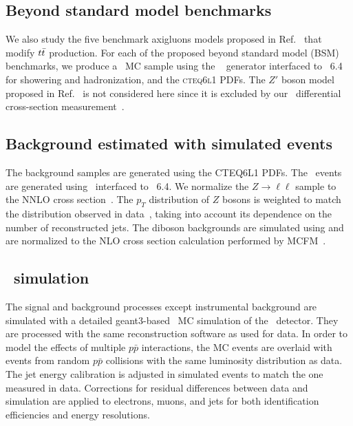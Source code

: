 \documentclass[aps,prd,twocolumn,showpacs,superscriptaddress,groupedaddress,floatfix]{revtex4}
\begin{document}
\subsection{Beyond standard model benchmarks}
\label{sec:BSM_description}

We also study the five benchmark axigluons models proposed in Ref.~\cite{Carmona:2014gra} that modify  $t\bar{t}$ production.
For each of the proposed beyond standard model (BSM) benchmarks,
we  produce a \ttbar\ MC sample 
using the \madgraph~\cite{Alwall:2014hca} generator interfaced to \pythia~6.4 for showering and hadronization, and the \textsc{cteq6l1} PDFs.
The $Z'$ boson model proposed in  Ref.~\cite{Carmona:2014gra} is not
considered here since it is  excluded by our \ttbar\ differential cross-section measurement~\cite{Abazov:2014vga}.

\subsection{Background estimated with simulated events}
\label{sec:bkgmc}
The background samples are generated using the {\textsc{CTEQ6L1}}  PDFs.
The \zl\ events are generated using   \alpgen\ interfaced to \pythia~6.4. We normalize the $Z \rightarrow \ell\ell$ sample to the NNLO cross section~\cite{Gavin:2010az}.
The $p_{T}$ distribution of $Z$ bosons is weighted to match the distribution observed in
data~\cite{Abazov:2007ac}, taking into account its dependence on the number of reconstructed jets. 
The diboson backgrounds are simulated using {\pythia} and are  normalized to the NLO cross section calculation performed by {\textsc{MCFM}}~\cite{Campbell:1999ah,mcfm}.



\subsection{\dzero\ simulation}
\label{sec:simulation}
The signal and background processes except instrumental background are simulated with
a detailed {\sc geant3}-based~\cite{bib:geant} MC  simulation of the \dzero\
detector. They are processed
with the same reconstruction software as used for  data.
In order to model the effects of multiple $p\bar{p}$
interactions, the MC events are overlaid with events from random
$p\bar{p}$ collisions with the same luminosity distribution as data. 
The jet energy calibration is adjusted in simulated events to match the one measured in data.
Corrections for residual differences between
data and simulation are applied to electrons, muons, and
jets for both  identification efficiencies and energy resolutions.
\end{document}
